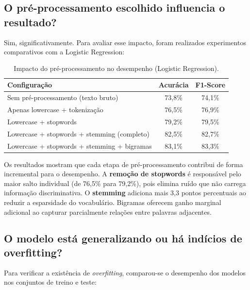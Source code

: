 \documentclass[12pt,a4paper]{article}
\begin{document}
\subsection{O pré-processamento escolhido influencia o resultado?}

Sim, significativamente. Para avaliar esse impacto, foram realizados experimentos comparativos com a Logistic Regression:

\begin{table}[H]
\centering
\caption{Impacto do pré-processamento no desempenho (Logistic Regression).}
\label{tab:preproc}
\begin{tabular}{lcc}
\toprule
\textbf{Configuração} & \textbf{Acurácia} & \textbf{F1-Score} \\
\midrule
Sem pré-processamento (texto bruto) & 73,8\% & 74,1\% \\
Apenas lowercase + tokenização & 76,5\% & 76,9\% \\
Lowercase + stopwords & 79,2\% & 79,5\% \\
Lowercase + stopwords + stemming (completo) & 82,5\% & 82,7\% \\
Lowercase + stopwords + stemming + bigramas & 83,1\% & 83,3\% \\
\bottomrule
\end{tabular}
\end{table}

Os resultados mostram que cada etapa de pré-processamento contribui de forma incremental para o desempenho. A \textbf{remoção de stopwords} é responsável pelo maior salto individual (de 76,5\% para 79,2\%), pois elimina ruído que não carrega informação discriminativa. O \textbf{stemming} adiciona mais 3,3 pontos percentuais ao reduzir a esparsidade do vocabulário. Bigramas oferecem ganho marginal adicional ao capturar parcialmente relações entre palavras adjacentes.

\subsection{O modelo está generalizando ou há indícios de overfitting?}

Para verificar a existência de \textit{overfitting}, comparou-se o desempenho dos modelos nos conjuntos de treino e teste:
\end{document}
